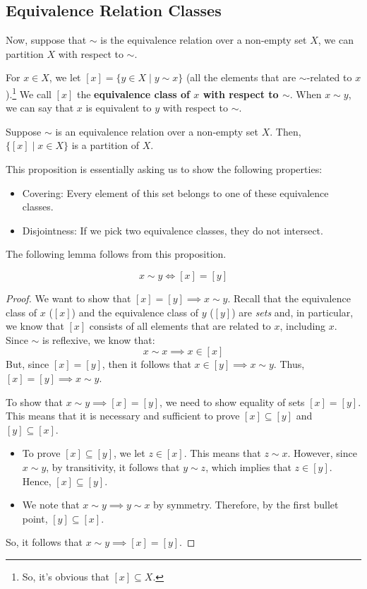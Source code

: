 \documentclass[letterpaper]{article}
\begin{document}
\subsection{Equivalence Relation Classes}
Now, suppose that $\sim$ is the equivalence relation over a non-empty set $X$, we can partition $X$ with respect to $\sim$. 

\bigskip 

For $x \in X$, we let $[x] = \{y \in X \mid y \sim x\}$ (all the elements that are $\sim$-related to $x$).\footnote{So, it's obvious that $[x] \subseteq X$.} We call $[x]$ the \textbf{equivalence class of $x$ with respect to $\sim$}. When $x \sim y$, we can say that $x$ is equivalent to $y$ with respect to $\sim$. 

\begin{proposition}
    Suppose $\sim$ is an equivalence relation over a non-empty set $X$. Then, $\{[x] \mid x \in X\}$ is a partition of $X$. 
\end{proposition}
This proposition is essentially asking us to show the following properties: 
\begin{itemize}
    \item Covering: Every element of this set belongs to one of these equivalence classes. 
    \item Disjointness: If we pick two equivalence classes, they do not intersect.
\end{itemize}
The following lemma follows from this proposition.
\begin{lemma}{}{}
    \[x \sim y \iff [x] = [y]\]
\end{lemma}
\begin{mdframed}
    \begin{proof}
        We want to show that $[x] = [y] \implies x \sim y$. Recall that the equivalence class of $x$ ($[x]$) and the equivalence class of $y$ ($[y]$) are \emph{sets} and, in particular, we know that $[x]$ consists of all elements that are related to $x$, including $x$. Since $\sim$ is reflexive, we know that:
        \[x \sim x \implies x \in [x]\]
        But, since $[x] = [y]$, then it follows that $x \in [y] \implies x \sim y$. Thus, $[x] = [y] \implies x \sim y$. 
        
        \bigskip 
    
        To show that $x \sim y \implies [x] = [y]$, we need to show equality of sets $[x] = [y]$. This means that it is necessary and sufficient to prove $[x] \subseteq [y]$ and $[y] \subseteq [x]$.
        \begin{itemize}
            \item To prove $[x] \subseteq [y]$, we let $z \in [x]$. This means that $z \sim x$. However, since $x \sim y$, by transitivity, it follows that $y \sim z$, which implies that $z \in [y]$. Hence, $[x] \subseteq [y]$. 
            \item We note that $x \sim y \implies y \sim x$ by symmetry. Therefore, by the first bullet point, $[y] \subseteq [x]$.
        \end{itemize} 
        So, it follows that $x \sim y \implies [x] = [y]$. 
    \end{proof}
\end{mdframed}
\end{document}
